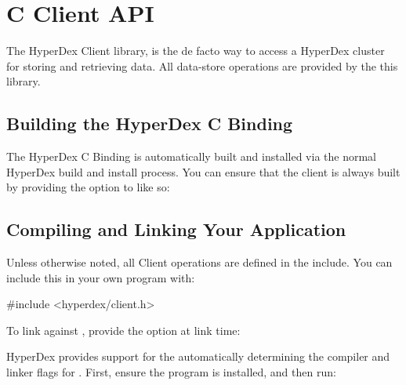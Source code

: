 \chapter{C Client API}
\label{chap:api:c-client}

The HyperDex Client library,  is the de facto way to
access a HyperDex cluster for storing and retrieving data.  All data-store
operations are provided by the this library.

\section{Building the HyperDex C Binding}
\label{sec:api:c:client:build}

The HyperDex C Binding is automatically built and installed via the normal
HyperDex build and install process.  You can ensure that the client is always
built by providing the  option to  like
so:

\begin{consolecode}
\end{consolecode}

\section{Compiling and Linking Your Application}
\label{sec:api:c:client:link}
Unless otherwise noted, all Client operations are defined in the
 include.  You can include this in your own program
with:

\begin{ccode}
#include <hyperdex/client.h>
\end{ccode}

To link against , provide the 
option at link time:

\begin{consolecode}
\end{consolecode}

HyperDex provides support for the automatically determining the compiler and
linker flags for .  First, ensure the 
program is installed, and then run:

\begin{consolecode}
\end{consolecode}

